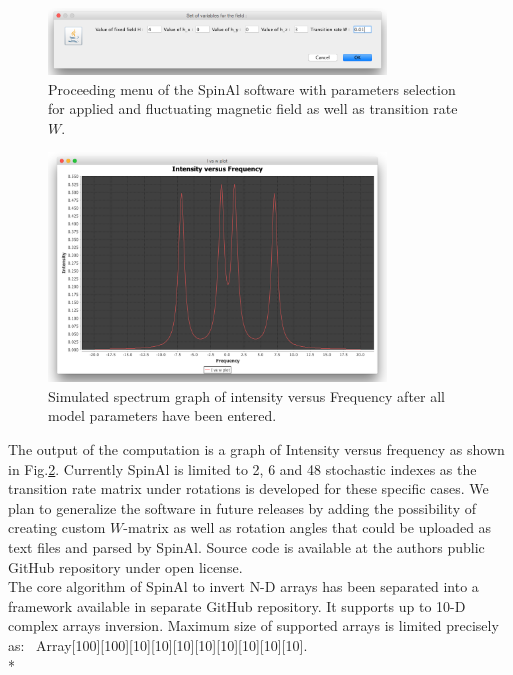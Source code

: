 \begin{figure}[h!]
\centering
\includegraphics[width=0.8\textwidth]{figures/chap2/spinal2.png}
\caption{Proceeding menu of the SpinAl software with parameters selection for applied and fluctuating magnetic field as well as transition rate $W$.}
\label{figure:SpinAl2}
\end{figure}
\begin{figure}[h!]
\centering
\includegraphics[width=0.8\textwidth]{figures/chap2/spinal3.png}
\caption{Simulated spectrum graph of intensity versus Frequency after all model parameters have been entered.}
\label{figure:SpinAl3}
\end{figure}
The output of the computation is a graph of Intensity versus frequency as shown in Fig.\ref{figure:SpinAl3}.
Currently SpinAl is limited to 2, 6 and 48 stochastic indexes as the transition rate matrix under rotations is developed for these specific cases. We plan to generalize the software in future releases by adding the possibility of creating custom $W$-matrix as well as rotation angles that could be uploaded as text files and parsed by SpinAl. Source code is available at the authors public GitHub repository under open license\cite{nmrgit}.\\
The core algorithm of SpinAl to invert N-D arrays has been separated into a framework available in separate GitHub repository\cite{ndgit}. It supports up to 10-D complex arrays inversion. Maximum size of supported arrays is limited precisely as: \ Array[100][100][10][10][10][10][10][10][10][10].\\*
